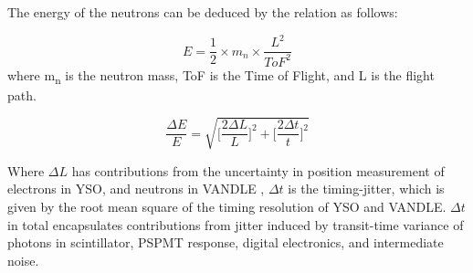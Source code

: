 \documentclass[a4paper,12pt,twoside]{report}
\begin{document}
The energy of the neutrons can be deduced by the relation as follows:

\begin{equation}
    E=\frac{1}{2} \times m_{n} \times  \frac{ L^2}{ ToF^{2}}
\end{equation}
where m\textsubscript{n} is the neutron mass, ToF is the Time of Flight, and L is the flight path. 

\begin{equation}
    \frac{\Delta E}{E}  = \sqrt{\Bigg[\frac{2\Delta L}{L}\Bigg]^2 + \Bigg[\frac{2\Delta t}{t}\Bigg]^2}
\end{equation}

Where $\Delta L$ has contributions from the uncertainty in position measurement of electrons in YSO, and neutrons in VANDLE \cite{VANDLE}, $\Delta t$ is the timing-jitter, which is given by the root mean square of the timing resolution of YSO and VANDLE. $\Delta t$ in total encapsulates contributions from jitter induced by transit-time variance of photons in scintillator,  PSPMT response, digital electronics, and intermediate noise. 
\end{document}

